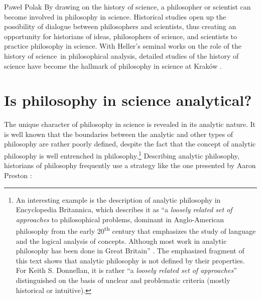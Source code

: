 \begin{artengenv}{Paweł Polak}
By drawing on the history of science, a philosopher or scientist can become involved in philosophy in science.
Historical studies open up the possibility of dialogue between philosophers and scientists, thus creating an
opportunity for historians of ideas, philosophers of science, and scientists to practice philosophy in science. With
Heller’s seminal works on the role of the history of science~in philosophical analysis, detailed studies of the history
of science have become the hallmark of philosophy in science at Kraków
\parencite{pol_polak_tradycja_2018}.

\enlargethispage{1\baselineskip}

\section{Is philosophy in science analytical?}
The unique character of philosophy in science is revealed in its analytic nature. It is well known that the boundaries
between the analytic and other types of philosophy are rather poorly defined, despite the fact that the concept of
analytic philosophy is well entrenched in philosophy.\footnote{An interesting example is the description of analytic
philosophy in Encyclopedia Britannica, which describes it as ``a \textit{loosely related set of approaches} to
philosophical problems, dominant in Anglo-American philosophy from the early 20\textsuperscript{th} century that emphasizes the study of
language and the logical analysis of concepts. Although most work in analytic philosophy has been done in Great
Britain''
\parencite{pol_preston_analytic_nodate}.
The emphasized fragment of this text shows that analytic philosophy is not defined by their
properties. For Keith S. Donnellan, it is rather ``a \textit{loosely related set of approaches}'' distinguished on the
basis of unclear and problematic criteria (mostly historical or intuitive).} Describing
analytic philosophy, historians of philosophy frequently use a strategy like the one presented by Aaron Preston
\parencite*{pol_preston_analytic_nodate}:





\end{artengenv}
